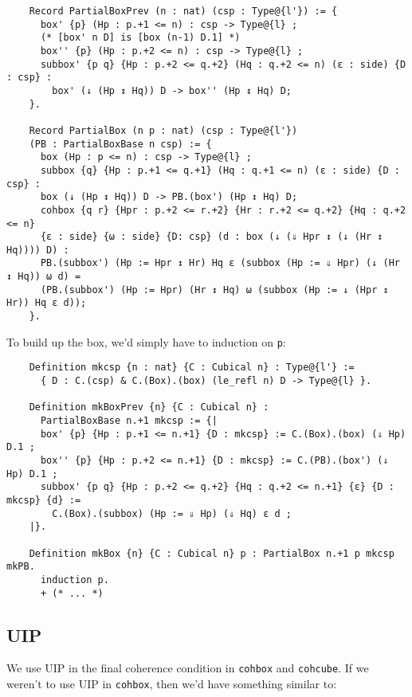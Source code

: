 \documentclass[10pt]{art}
\begin{document}
\begin{listing}[H]
  \begin{verbatim}
    Record PartialBoxPrev (n : nat) (csp : Type@{l'}) := {
      box' {p} (Hp : p.+1 <= n) : csp -> Type@{l} ;
      (* [box' n D] is [box (n-1) D.1] *)
      box'' {p} (Hp : p.+2 <= n) : csp -> Type@{l} ;
      subbox' {p q} {Hp : p.+2 <= q.+2} (Hq : q.+2 <= n) (ε : side) {D : csp} :
        box' (↓ (Hp ↕ Hq)) D -> box'' (Hp ↕ Hq) D;
    }.

    Record PartialBox (n p : nat) (csp : Type@{l'})
    (PB : PartialBoxBase n csp) := {
      box (Hp : p <= n) : csp -> Type@{l} ;
      subbox {q} {Hp : p.+1 <= q.+1} (Hq : q.+1 <= n) (ε : side) {D : csp} :
      box (↓ (Hp ↕ Hq)) D -> PB.(box') (Hp ↕ Hq) D;
      cohbox {q r} {Hpr : p.+2 <= r.+2} {Hr : r.+2 <= q.+2} {Hq : q.+2 <= n}
      {ε : side} {ω : side} {D: csp} (d : box (↓ (⇓ Hpr ↕ (↓ (Hr ↕ Hq)))) D) :
      PB.(subbox') (Hp := Hpr ↕ Hr) Hq ε (subbox (Hp := ⇓ Hpr) (↓ (Hr ↕ Hq)) ω d) =
      (PB.(subbox') (Hp := Hpr) (Hr ↕ Hq) ω (subbox (Hp := ↓ (Hpr ↕ Hr)) Hq ε d));
    }.
  \end{verbatim}
\end{listing}

To build up the box, we'd simply have to induction on \texttt{p}:

\begin{listing}[H]
  \begin{verbatim}
    Definition mkcsp {n : nat} {C : Cubical n} : Type@{l'} :=
      { D : C.(csp) & C.(Box).(box) (le_refl n) D -> Type@{l} }.

    Definition mkBoxPrev {n} {C : Cubical n} :
      PartialBoxBase n.+1 mkcsp := {|
      box' {p} {Hp : p.+1 <= n.+1} {D : mkcsp} := C.(Box).(box) (⇓ Hp) D.1 ;
      box'' {p} {Hp : p.+2 <= n.+1} {D : mkcsp} := C.(PB).(box') (⇓ Hp) D.1 ;
      subbox' {p q} {Hp : p.+2 <= q.+2} {Hq : q.+2 <= n.+1} {ε} {D : mkcsp} {d} :=
        C.(Box).(subbox) (Hp := ⇓ Hp) (⇓ Hq) ε d ;
    |}.

    Definition mkBox {n} {C : Cubical n} p : PartialBox n.+1 p mkcsp mkPB.
      induction p.
      + (* ... *)
  \end{verbatim}
\end{listing}

\subsection{UIP}
We use UIP in the final coherence condition in \texttt{cohbox} and \texttt{cohcube}. If we weren't to use UIP in \texttt{cohbox}, then we'd have something similar to:
\end{document}
